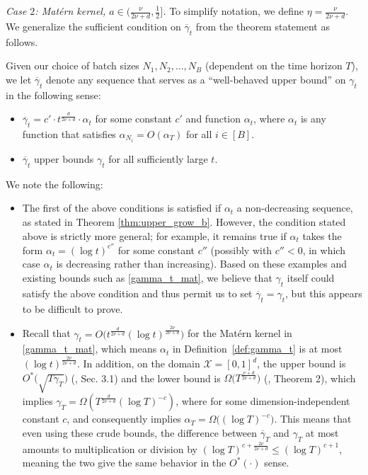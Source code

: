 \documentclass[10pt]{article}
\begin{document}
\emph{Case $2$: Mat\'ern kernel, $a\in (\frac{\nu}{2\nu+d}, \frac{1}{2}] $.}
To simplify notation, we define $\eta = \frac{\nu}{2\nu+d}$. We generalize the sufficient condition on $\overline{\gamma}_t$ from the theorem statement as follows.
\begin{definition}
    \label{def:gamma_t}
    Given our choice of batch sizes $N_1,N_2,\dotsc,N_B$ (dependent on the time horizon $T$), we let $\overline{\gamma}_t$ denote any sequence that serves as a ``well-behaved upper bound'' on $\gamma_t$ in the following sense:
    \begin{itemize}
        \item $\overline{\gamma}_t = c' \cdot t^{\frac{d}{2\nu+d}} \cdot\alpha_t$ for some constant $c'$ and function $\alpha_t$, where $\alpha_t$ is any function that satisfies $\alpha_{N_i}= O(\alpha_T)$ for all $i\in[B]$.
        \item $\overline{\gamma}_t$ upper bounds $\gamma_t$ for all sufficiently large $t$.
    \end{itemize}
\end{definition}

\begin{remark}
    \label{rmk:near-optimal}
    We note the following:
    \begin{itemize}
        \item The first of the above conditions is satisfied if $\alpha_t$ a non-decreasing sequence, as stated in Theorem \ref{thm:upper_grow_b}.  However, the condition stated above is strictly more general; for example, it remains true if $\alpha_t$ takes the form $\alpha_t = (\log t)^{c''} $ for some constant $c''$ (possibly with $c'' < 0$, in which case $\alpha_t$ is decreasing rather than increasing).  Based on these examples and existing bounds such as \eqref{gamma_t_mat}, we believe that $\gamma_t$ itself could satisfy the above condition and thus permit us to set $\overline{\gamma}_t = \gamma_t$, but this appears to be difficult to prove.

        \item     Recall that $\gamma_t = O \bigl( t^{\frac{d}{2\nu+d}} \left( \log t \right)^{\frac{2\nu}{2\nu +d}} \bigr)$ for the Mat\'ern kernel in \eqref{gamma_t_mat}, which means $\alpha_t$ in Definition~\ref{def:gamma_t} is at most $(\log t)^{\frac{2\nu}{2\nu+d}}$. In addition, on the domain $\mathcal{X} = [0,1]^d$, the upper bound is $O^*\bigl(\sqrt{T\gamma_T}\bigr)$ (\cite{Li22}, Sec. 3.1) and the lower bound is $\Omega\bigl(T^{\frac{\nu+d}{2\nu+d}}\bigr)$ (\cite{Scarlett17}, Theorem 2), which implies $\gamma_T = \Omega(T^{\frac{d}{2\nu+d}} (\log T)^{-c})$, where for some dimension-independent constant $c$, and consequently implies $\alpha_T = \Omega\bigl((\log T)^{-c} \bigr)$.
    This means that even using these crude bounds, the difference between $\overline{\gamma}_T$ and $\gamma_T$ at most amounts to multiplication or division by $(\log T)^{c + \frac{2\nu}{2\nu+d}} \leq (\log T)^{c+ 1}$, meaning the two give the same behavior in the $O^*(\cdot)$ sense. 
    \end{itemize}

\end{remark}
\end{document}
